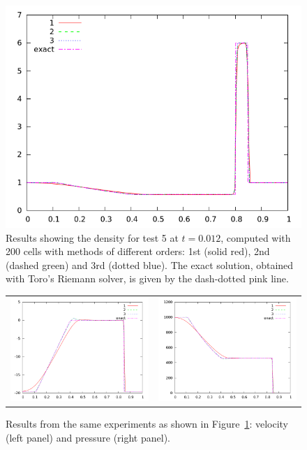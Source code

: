 \documentclass[10pt]{article}
\begin{document}
\begin{figure}[h]
  \begin{center}
     \includegraphics[width=.78\textwidth]{den_T5.png}	
  \end{center}
  \caption{Results showing the density for test 5 at $t=0.012$, computed with 200 cells with methods of different orders: 1st (solid red), 2nd (dashed green) and 3rd (dotted blue). The exact solution, obtained with Toro's Riemann solver, is given by the dash-dotted pink line.}
  \label{fig:den_T5}
\end{figure}

\begin{figure}
  \begin{center}
	\begin{tabular}{cc}
      \includegraphics[width=.425\textwidth]{vel_T5.png} &
	  \includegraphics[width=.425\textwidth]{prs_T5.png}
	\end{tabular}
  \end{center}
  \caption{Results from the same experiments as shown in Figure~\ref{fig:den_T5}:
  velocity (left panel) and pressure (right panel).}
\end{figure}
\clearpage
\end{document}
